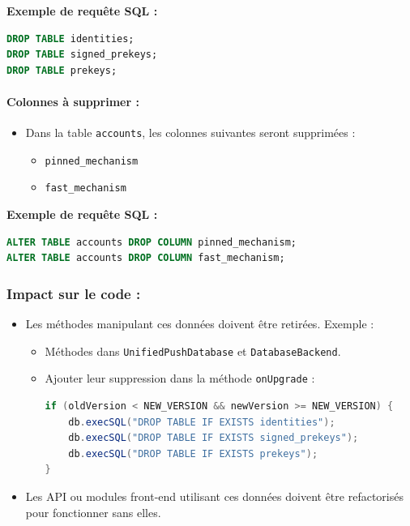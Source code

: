 \documentclass[a4paper,11pt]{article}
\begin{document}
\textbf{Exemple de requête SQL :}
\begin{lstlisting}[language=SQL]
DROP TABLE identities;
DROP TABLE signed_prekeys;
DROP TABLE prekeys;
\end{lstlisting}

\paragraph{Colonnes à supprimer :}
\begin{itemize}
    \item Dans la table \texttt{accounts}, les colonnes suivantes seront supprimées :
    \begin{itemize}
        \item \texttt{pinned\_mechanism}
        \item \texttt{fast\_mechanism}
    \end{itemize}
\end{itemize}

\textbf{Exemple de requête SQL :}
\begin{lstlisting}[language=SQL]
ALTER TABLE accounts DROP COLUMN pinned_mechanism;
ALTER TABLE accounts DROP COLUMN fast_mechanism;
\end{lstlisting}

\subsubsection*{Impact sur le code :}
\begin{itemize}
    \item Les méthodes manipulant ces données doivent être retirées. Exemple :
    \begin{itemize}
        \item Méthodes dans \texttt{UnifiedPushDatabase} et \texttt{DatabaseBackend}.
        \item Ajouter leur suppression dans la méthode \texttt{onUpgrade} :
        
\begin{lstlisting}[language=Java]
if (oldVersion < NEW_VERSION && newVersion >= NEW_VERSION) {
    db.execSQL("DROP TABLE IF EXISTS identities");
    db.execSQL("DROP TABLE IF EXISTS signed_prekeys");
    db.execSQL("DROP TABLE IF EXISTS prekeys");
}
\end{lstlisting}
    \end{itemize}
    \item Les API ou modules front-end utilisant ces données doivent être refactorisés pour fonctionner sans elles.
\end{itemize}
\end{document}
